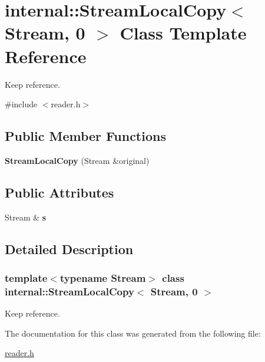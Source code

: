 \hypertarget{a02328}{}\section{internal\+:\+:Stream\+Local\+Copy$<$ Stream, 0 $>$ Class Template Reference}
\label{a02328}


Keep reference.  




{\ttfamily \#include $<$reader.\+h$>$}

\subsection*{Public Member Functions}
\begin{DoxyCompactItemize}
\item 
\mbox{\label{a02328_ac684a7be07d79d6ddd274dc1150f4b79}} 
{\bfseries Stream\+Local\+Copy} (Stream \&original)
\end{DoxyCompactItemize}
\subsection*{Public Attributes}
\begin{DoxyCompactItemize}
\item 
\mbox{\label{a02328_ad31147888384f4bd51eabc2d7acdc4b6}} 
Stream \& {\bfseries s}
\end{DoxyCompactItemize}


\subsection{Detailed Description}
\subsubsection*{template$<$typename Stream$>$\newline
class internal\+::\+Stream\+Local\+Copy$<$ Stream, 0 $>$}

Keep reference. 

The documentation for this class was generated from the following file\+:\begin{DoxyCompactItemize}
\item 
\hyperlink{a00563}{reader.\+h}\end{DoxyCompactItemize}
